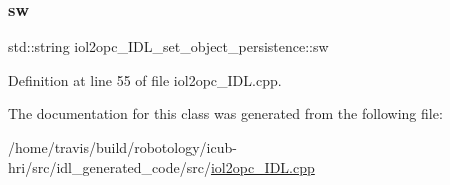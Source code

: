 \mbox{\label{classiol2opc__IDL__set__object__persistence_ad1cfe762cb32fe3d36a631a7e35d0884}} 
\subsubsection{\texorpdfstring{sw}{sw}}
{\footnotesize\ttfamily std\+::string iol2opc\+\_\+\+I\+D\+L\+\_\+set\+\_\+object\+\_\+persistence\+::sw}



Definition at line 55 of file iol2opc\+\_\+\+I\+D\+L.\+cpp.



The documentation for this class was generated from the following file\+:\begin{DoxyCompactItemize}
\item 
/home/travis/build/robotology/icub-\/hri/src/idl\+\_\+generated\+\_\+code/src/\hyperlink{iol2opc__IDL_8cpp}{iol2opc\+\_\+\+I\+D\+L.\+cpp}\end{DoxyCompactItemize}
